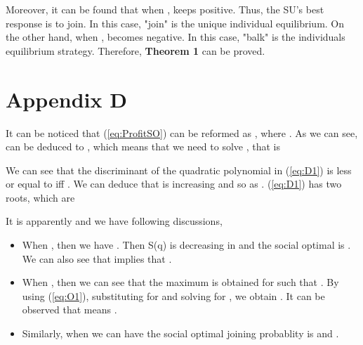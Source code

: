 \documentclass[journal]{IEEEtran}
\begin{document}
Moreover, it can be found that when ,  keeps positive. Thus, the
SU's best response is to join. In this case, "join" is the unique
individual equilibrium. On the other hand, when ,  becomes negative. In this case,
"balk" is the individuals equilibrium strategy. Therefore,
\textbf{Theorem 1} can be proved.

\section*{Appendix D}

It can be noticed that (\ref{eq:ProfitSO}) can be reformed as
, where . As we can see,  can
be deduced to , which means that we need to
solve , that is



We can see that the discriminant of the quadratic polynomial in
(\ref{eq:D1}) is less or equal to  iff . We can
deduce that  is increasing and so as . (\ref{eq:D1})
has two roots, which are


It is apparently  and we have following discussions,

\begin{itemize}
    \item When , then we have . Then S(q)
    is decreasing in  and the social optimal is . We
    can also see that  implies that .
    \item When , then we can see that the maximum
     is obtained for  such that . By using
    (\ref{eq:O1}), substituting  for  and solving for ,
    we obtain . It can be observed that  means
.

    \item Similarly, when  we can have the social
    optimal joining probablity is  and .
\end{itemize}
\end{document}
